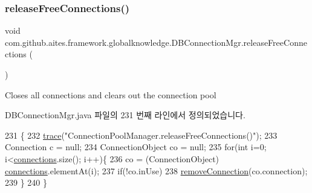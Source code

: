 \subsubsection{\texorpdfstring{release\+Free\+Connections()}{releaseFreeConnections()}}
{\footnotesize\ttfamily void com.\+github.\+aites.\+framework.\+globalknowledge.\+D\+B\+Connection\+Mgr.\+release\+Free\+Connections (\begin{DoxyParamCaption}{ }\end{DoxyParamCaption})}



Closes all connections and clears out the connection pool 



D\+B\+Connection\+Mgr.\+java 파일의 231 번째 라인에서 정의되었습니다.


\begin{DoxyCode}
231                                         \{
232         \mbox{\hyperlink{classcom_1_1github_1_1aites_1_1framework_1_1globalknowledge_1_1_d_b_connection_mgr_ae9ff677183d99acafb2da9cd8ba6de20}{trace}}(\textcolor{stringliteral}{"ConnectionPoolManager.releaseFreeConnections()"});
233         Connection c = null;
234         ConnectionObject co = null;
235         \textcolor{keywordflow}{for}(\textcolor{keywordtype}{int} i=0; i<\mbox{\hyperlink{classcom_1_1github_1_1aites_1_1framework_1_1globalknowledge_1_1_d_b_connection_mgr_a2a178e6371fa020ccca3e12574ef2e14}{connections}}.size(); i++)\{
236             co = (ConnectionObject) \mbox{\hyperlink{classcom_1_1github_1_1aites_1_1framework_1_1globalknowledge_1_1_d_b_connection_mgr_a2a178e6371fa020ccca3e12574ef2e14}{connections}}.elementAt(i);
237             \textcolor{keywordflow}{if}(!co.inUse)
238                 \mbox{\hyperlink{classcom_1_1github_1_1aites_1_1framework_1_1globalknowledge_1_1_d_b_connection_mgr_a0174f80ba00e50211d2b3faff76ee5d3}{removeConnection}}(co.connection);
239         \}
240     \}
\end{DoxyCode}
\mbox{\label{classcom_1_1github_1_1aites_1_1framework_1_1globalknowledge_1_1_d_b_connection_mgr_a0174f80ba00e50211d2b3faff76ee5d3}} 
